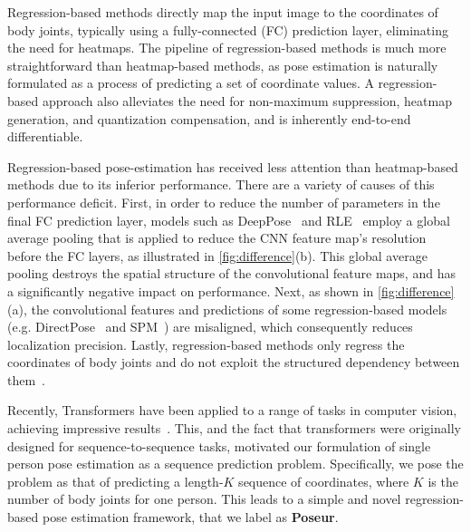 \documentclass[runningheads]{llncs}
\def\handle{{Poseur}\xspace}
\begin{document}
Regression-based methods directly map the input image to the coordinates of body joints, typically using a fully-connected (FC) prediction layer, eliminating the need for heatmaps. The pipeline of regression-based methods is much more {straightforward} than heatmap-based methods, as pose estimation is 
naturally
formulated
as a process of predicting a set of 
coordinate values. 
A regression-based approach also alleviates the need for non-maximum suppression, heatmap generation, and quantization compensation, and is inherently end-to-end differentiable.


Regression-based pose-estimation has received less attention than heatmap-based methods due to its inferior performance. 
There are a variety of causes of this performance deficit. First, in order to reduce the number of parameters in the
final FC
prediction layer, models such as DeepPose~\cite{2014deeppose} and RLE~\cite{li2021rle}
employ 
a global average pooling that is applied to reduce the CNN feature map's resolution before the FC layers, as illustrated in \cref{fig:difference}(b).
This global average pooling destroys the spatial structure of the convolutional feature maps, and has a significantly negative impact on performance. Next, as shown in \cref{fig:difference}(a), the convolutional features and predictions of some regression-based models (e.g.  DirectPose~\cite{tian2019directpose} and SPM~\cite{nie2019single}) are misaligned, which consequently reduces localization precision. Lastly, regression-based methods only regress the coordinates of body joints and do not exploit the structured dependency between them~\cite{sun2017compositional}. 




Recently, Transformers have been applied to a range of tasks in computer vision, achieving impressive results~\cite{zhu2020deformable,dosovitskiy2020image,carion2020end}. This, and the fact that transformers were originally designed for sequence-to-sequence tasks, motivated our formulation of single person pose estimation as a sequence prediction problem.  Specifically, we pose the problem as that of predicting a length-$K$ sequence of coordinates, where $K$ is the number of body joints for one person. This leads to a simple and novel regression-based pose estimation framework, that we label as \textbf{\handle}.
\end{document}
